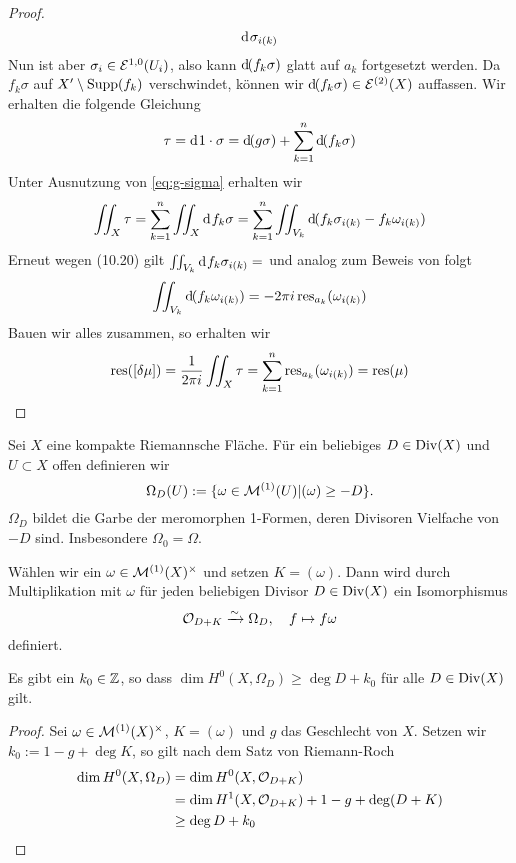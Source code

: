 \begin{proof}
\[  \d[\sigma_{i(k)}]
  \]
  Nun ist aber $\sigma_i \in \mathcal{E}^{1,0}(U_i)$, also kann $\d[(f_k
  \sigma)]$ glatt auf $a_k$ fortgesetzt werden. Da $f_k\sigma$ auf $X'
  \setminus \operatorname{Supp}(f_k)$ verschwindet, können wir $\d[(f_k \sigma)] \in
  \diff^{(2)}(X)$ auffassen. Wir erhalten die folgende Gleichung
  \[
  \tau = \d[1 \cdot \sigma] = \d[(g\sigma)] + \sum_{k=1}^n \d[(f_k
  \sigma)]
  \]
  Unter Ausnutzung von \eqref{eq:g-sigma} erhalten wir
  \[
  \iint_X \tau = \sum_{k=1}^n \iint_X \d[f_k \sigma] = \sum_{k=1}^n
  \iint_{V_k} \d[(f_k\sigma_{i(k)} - f_k \omega_{i(k)} )]
  \]
  Erneut wegen (10.20) gilt $\iint_{V_k} \d[f_k \sigma_{i(k)}] = $ und
  analog zum Beweis von \cite[Satz 10.21]{For} folgt
  \[
  \iint_{V_k} \d[(f_k \omega_{i(k)})] = - 2\pi i
  \res_{a_k}(\omega_{i(k)})
  \]
  Bauen wir alles zusammen, so erhalten wir
  \[
  \operatorname{res}([\delta \mu]) = \frac{1}{2\pi i} \iint_X \tau = \sum_{k=1}^n
  \operatorname{res}_{a_k}(\omega_{i(k)}) = \operatorname{res}(\mu)
  \]
\end{proof}

\begin{defin}
  \label{def:garbe-div}
  Sei $X$ eine kompakte Riemannsche Fläche. Für ein beliebiges $D \in
  \operatorname{Div}(X)$ und $U \subset X$ offen definieren wir
  \[
  \Omega_D(U) := \{ \omega \in \mathcal{M}^{(1)}(U) | (\omega) \geq -D \}.
  \]
  $\Omega_D$ bildet die Garbe der meromorphen 1-Formen, deren
  Divisoren Vielfache von $-D$ sind. Insbesondere $\Omega_0 = \Omega$.

  Wählen wir ein $\omega \in \mathcal{M}^{(1)}(X)^\times$ und setzen $K =
  (\omega)$. Dann wird durch Multiplikation mit $\omega$ für jeden
  beliebigen Divisor $D \in \operatorname{Div}(X)$ ein Isomorphismus
  \[
  \mathcal{O}_{D+K} \xrightarrow{\sim} \Omega_D, \quad f \mapsto f \omega
  \]
  definiert.
\end{defin}


\begin{lemma}
  \label{lemma:k0}
  Es gibt ein $k_0 \in \mathbb{Z}$, so dass $\dim H^0(X, \Omega_D) \geq \deg D
  + k_0$ für alle $D \in \operatorname{Div}(X)$ gilt.
\end{lemma}

\begin{proof}
  Sei $\omega \in \mathcal{M}^{(1)}(X)^\times$, $K = (\omega)$ und $g$ das
  Geschlecht von $X$. Setzen wir $k_0 := 1 - g + \deg K$, so gilt nach
  dem Satz von Riemann-Roch
  \begin{align*}
    \dim H^0(X, \Omega_D) & = \dim H^0(X, \mathcal{O}_{D+K}) \\
    & = \dim H^1(X, \mathcal{O}_{D+K}) + 1 - g + \deg(D+K) \\
    & \geq \deg D + k_0
  \end{align*}
\end{proof}

